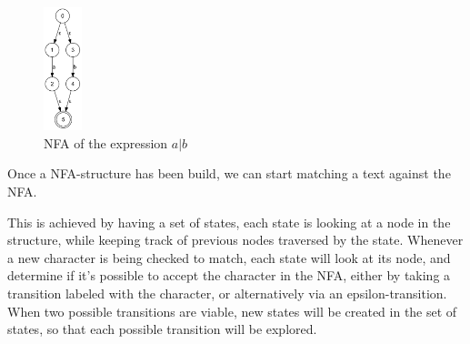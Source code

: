 \begin{figure}[h!]
  \centering
      \includegraphics[width=0.1\textwidth]{lib/A_OR_B.png}
  \caption{NFA of the expression $a | b$}
\label{fig:A_OR_B}
\end{figure}

Once a NFA-structure has been build, we can start matching a text against the NFA.

This is achieved by having a set of states, each state is looking at a node in the structure, while keeping track of previous nodes traversed by the state. Whenever a new character is being checked to match, each state will look at its node, and determine if it's possible to accept the character in the NFA, either by taking a transition labeled with the character, or alternatively via an epsilon-transition. When two possible transitions are viable, new states will be created in the set of states, so that each possible transition will be explored.

